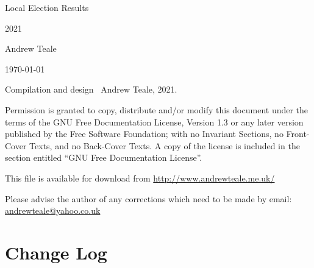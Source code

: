 \documentclass[a4paper,openany]{book}
\begin{document}

\begin{titlepage}

\begin{center}

\Huge Local Election Results

2021

\bigskip

\Large Andrew Teale

\vfill

\newcommand\versionno{0.10.1}


\today

\end{center}

\end{titlepage}


\begin{center}

%

\bigskip

Compilation and design \textcopyright\ Andrew Teale, 2021.

 Permission is granted to copy, distribute and/or modify this document
 under the terms of the GNU Free Documentation License, Version 1.3
 or any later version published by the Free Software Foundation;
 with no Invariant Sections, no Front-Cover Texts, and no Back-Cover Texts.
 A copy of the license is included in the section entitled ``GNU
 Free Documentation License''.

\bigskip

This file is available for download from
\url{http://www.andrewteale.me.uk/}

\bigskip

Please advise the author of any corrections which need to be made by
email: \url{andrewteale@yahoo.co.uk}

\vfill
\end{center}

\section*{Change Log}


%
\end{document}

